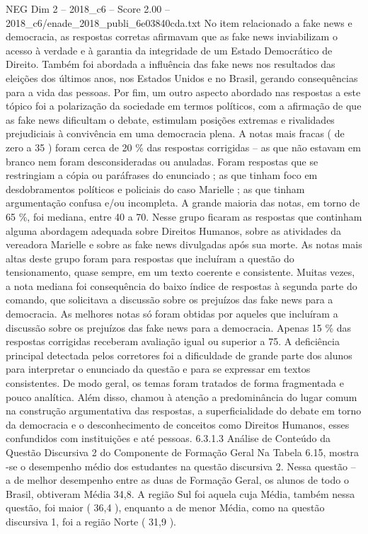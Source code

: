 \begin{textsample}{NEG Dim 2 – 2018\_c6 – Score 2.00 – 2018\_c6/enade\_2018\_publi\_6e03840cda.txt}
No item relacionado a fake news e democracia, as respostas corretas afirmavam que as fake news inviabilizam o acesso à verdade e à garantia da integridade de um Estado Democrático de Direito.
Também foi abordada a influência das fake news nos resultados das eleições dos últimos anos, nos Estados Unidos e no Brasil, gerando consequências para a vida das pessoas.
Por fim, um outro aspecto abordado nas respostas a este tópico foi a polarização da sociedade em termos políticos, com a afirmação de que as fake news dificultam o debate, estimulam posições extremas e rivalidades prejudiciais à convivência em uma democracia plena.
A notas mais fracas ( de zero a 35 ) foram cerca de 20 \% das respostas corrigidas – as que não estavam em branco nem foram desconsideradas ou anuladas.
Foram respostas que se restringiam a cópia ou paráfrases do enunciado ; as que tinham foco em desdobramentos políticos e policiais do caso Marielle ; as que tinham argumentação confusa e/ou incompleta.
A grande maioria das notas, em torno de 65 \%, foi mediana, entre 40 a 70.
Nesse grupo ficaram as respostas que continham alguma abordagem adequada sobre Direitos Humanos, sobre as atividades da vereadora Marielle e sobre as fake news divulgadas após sua morte.
As notas mais altas deste grupo foram para respostas que incluíram a questão do tensionamento, quase sempre, em um texto coerente e consistente.
Muitas vezes, a nota mediana foi consequência do baixo índice de respostas à segunda parte do comando, que solicitava a discussão sobre os prejuízos das fake news para a democracia.
As melhores notas só foram obtidas por aqueles que incluíram a discussão sobre os prejuízos das fake news para a democracia.
Apenas 15 \% das respostas corrigidas receberam avaliação igual ou superior a 75.
A deficiência principal detectada pelos corretores foi a dificuldade de grande parte dos alunos para interpretar o enunciado da questão e para se expressar em textos consistentes.
De modo geral, os temas foram tratados de forma fragmentada e pouco analítica.
Além disso, chamou à atenção a predominância do lugar comum na construção argumentativa das respostas, a superficialidade do debate em torno da democracia e o desconhecimento de conceitos como Direitos Humanos, esses confundidos com instituições e até pessoas. 6.3.1.3 Análise de Conteúdo da Questão Discursiva 2 do Componente de Formação Geral Na Tabela 6.15, mostra -se o desempenho médio dos estudantes na questão discursiva 2.
Nessa questão – a de melhor desempenho entre as duas de Formação Geral, os alunos de todo o Brasil, obtiveram Média 34,8.
A região Sul foi aquela cuja Média, também nessa questão, foi maior ( 36,4 ), enquanto a de menor Média, como na questão discursiva 1, foi a região Norte ( 31,9 ).

\end{textsample}
